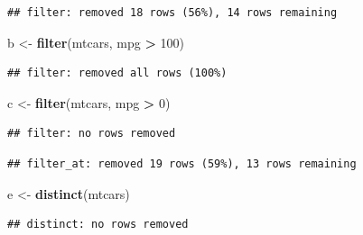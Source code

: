 \documentclass[
]{book}
\newenvironment{Shaded}{\begin{snugshade}}{\end{snugshade}}
\newcommand{\DecValTok}[1]{\textcolor[rgb]{0.00,0.00,0.81}{#1}}
\newcommand{\KeywordTok}[1]{\textcolor[rgb]{0.13,0.29,0.53}{\textbf{#1}}}
\newcommand{\NormalTok}[1]{#1}
\newcommand{\OperatorTok}[1]{\textcolor[rgb]{0.81,0.36,0.00}{\textbf{#1}}}
\newcommand{\StringTok}[1]{\textcolor[rgb]{0.31,0.60,0.02}{#1}}
\begin{document}
\begin{verbatim}
## filter: removed 18 rows (56%), 14 rows remaining
\end{verbatim}

\begin{Shaded}
\begin{Highlighting}[]
\NormalTok{b <-}\StringTok{ }\KeywordTok{filter}\NormalTok{(mtcars, mpg }\OperatorTok{>}\StringTok{ }\DecValTok{100}\NormalTok{)}
\end{Highlighting}
\end{Shaded}

\begin{verbatim}
## filter: removed all rows (100%)
\end{verbatim}

\begin{Shaded}
\begin{Highlighting}[]
\NormalTok{c <-}\StringTok{ }\KeywordTok{filter}\NormalTok{(mtcars, mpg }\OperatorTok{>}\StringTok{ }\DecValTok{0}\NormalTok{)}
\end{Highlighting}
\end{Shaded}

\begin{verbatim}
## filter: no rows removed
\end{verbatim}

\begin{Shaded}
\end{Shaded}

\begin{verbatim}
## filter_at: removed 19 rows (59%), 13 rows remaining
\end{verbatim}

\begin{Shaded}
\begin{Highlighting}[]
\NormalTok{e <-}\StringTok{ }\KeywordTok{distinct}\NormalTok{(mtcars)}
\end{Highlighting}
\end{Shaded}

\begin{verbatim}
## distinct: no rows removed
\end{verbatim}
\end{document}
